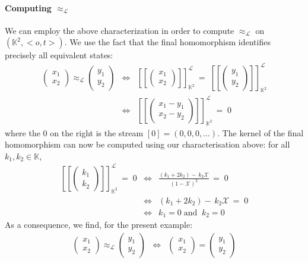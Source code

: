 \documentclass[3p]{elsarticle}
\newcommand{\X}{\mathcal{X}}           %
\newcommand{\fL}{\mathcal{L}}    %
\newcommand{\beh}[3]{\left[\!\left[ #1 \right]\!\right]^{#2}_{#3}} %
\newcommand{\K}{\mathbb{K}}            %
\begin{document}
\paragraph{Computing $\approx_{\fL}$}
We can employ the above characterization in order to compute $\approx_{\fL}$ on $(\K^2 , <o,t>)$. We use the fact
that the final homomorphism identifies precisely all
equivalent states:
\begin{eqnarray*}
\begin{pmatrix}
x_1 \\ x_2
\end{pmatrix}
\approx_\fL
\begin{pmatrix}
y_1 \\ y_2
\end{pmatrix}
& \iff &
\beh{\begin{pmatrix} x_1 \\ x_2
\end{pmatrix}}{\fL}{\K^2}
\, = \;
\beh{\begin{pmatrix} y_1 \\ y_2
\end{pmatrix}}{\fL}{\K^2}
\\
& \iff &
\beh{\begin{pmatrix} x_1 - y_1 \\ x_2 - y_2
\end{pmatrix}}{\fL}{\K^2}
\, = \;0
\end{eqnarray*}
where the $0$ on the right is the stream $[0] = (0,0,0, \ldots)$.
The kernel of the final homomorphism can now be computed using our
characterisation above: for all $k_1, k_2 \in \K$,
\begin{eqnarray*}
\beh{\begin{pmatrix} k_1 \\ k_2
\end{pmatrix}}{\fL}{\K^2}
\, = \;0
& \iff &
\frac{(k_1 + 2 k_2) - \,k_2\X }{(1-\X)^2}
\, = \; 0
\\
& \iff &
(k_1 + 2 k_2) - \,k_2\X \, = \; 0
\\
& \iff &
k_1 = 0 \; \mbox{and} \;\; k_2 = 0
\end{eqnarray*}
As a consequence, we find, for the present example:
\begin{eqnarray*}
\begin{pmatrix}
x_1 \\ x_2
\end{pmatrix}
\approx_\fL
\begin{pmatrix}
y_1 \\ y_2
\end{pmatrix}
& \iff &
\begin{pmatrix}
x_1 \\ x_2
\end{pmatrix}
=
\begin{pmatrix}
y_1 \\ y_2
\end{pmatrix}
\end{eqnarray*}
\end{document}
